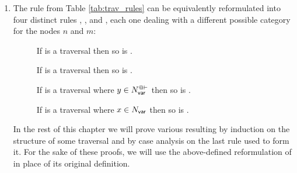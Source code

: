 \begin{remark} \hfill
\label{rem:traversal_rules}
\begin{enumerate}
\item
    The rule  from Table \ref{tab:trav_rules}
    can be equivalently reformulated into four distinct rules
    ,
    ,
     and
    , each one
    dealing with a different possible category for the nodes $n$
    and $m$:
    \begin{description}
    \item[]
      If 
    is a traversal then so is .

    \item[] If 
    is a traversal then so is .

    \item[] If  is a
    traversal where $y\in N_{\sf var}^{@\vdash}$ then so is
    .

    \item[] If 
    is a traversal where $x\in N_{\sf var}$ then so is
    .
    \end{description}
    In the rest of this chapter we will prove various resulting
    by induction on the structure of some traversal and by case
    analysis on the last rule used to form it. For the sake of
    these proofs, we will use the above-defined reformulation of
     in place of its original definition.


\end{enumerate}
\end{remark}
